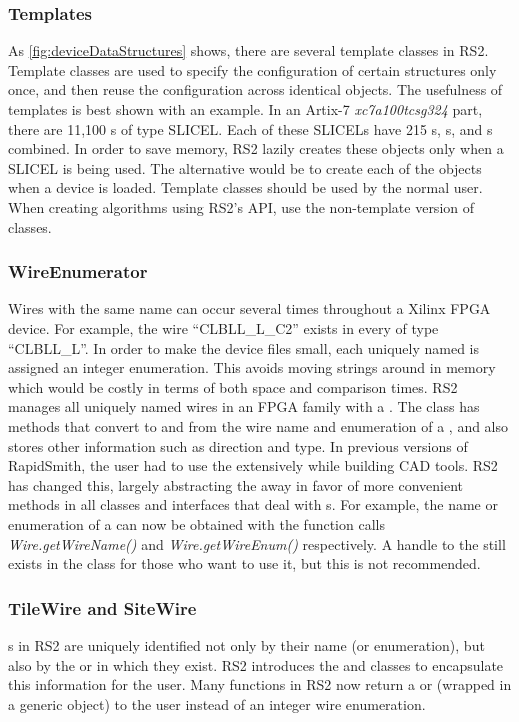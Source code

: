 \subsubsection{Templates}
As \autoref{fig:deviceDataStructures} shows, there are several template
classes in RS2. Template classes are used to specify the configuration of
certain structures only once, and then reuse the configuration across
identical objects. The usefulness of templates is best shown with an example. In
an Artix-7 {\em xc7a100tcsg324} part, there are 11,100 s of type
SLICEL. Each of these SLICELs have 215 s,  s, and
 s combined. In order to save memory, RS2
lazily creates these objects only when a SLICEL  is being used. The
alternative would be to create each of the objects when a device is loaded.
Template classes should  be used by the normal user. When creating
algorithms using RS2's API, use the non-template version of classes.

\subsubsection{WireEnumerator} \label{wireEnum}
Wires with the same name can occur several times throughout a Xilinx FPGA
device. For example, the wire ``CLBLL\-\_L\_C2'' exists in every  of
type ``CLBLL\_L''. In order to make the device files small, each uniquely named 
is assigned an integer enumeration. This avoids moving strings around in
memory which would be costly in terms of both space and comparison times.
RS2 manages all uniquely named wires in an FPGA family with a
. The  class has methods that convert to
and from the wire name and enumeration of a , and also stores other
 information such as direction and type. In previous versions of
RapidSmith, the user had to use the  extensively while
building CAD tools. RS2 has changed this, largely abstracting the
 away in favor of more convenient methods in all classes and
interfaces that deal with s. For example, the name or enumeration of a
 can now be obtained with the function calls {\em Wire.getWireName()}
and {\em Wire.getWireEnum()} respectively. A handle to the
 still exists in the  class for those who
want to use it, but this is not recommended. 

\subsubsection{TileWire and SiteWire} \label{wires}
s in RS2 are uniquely identified not only by their name
(or enumeration), but also by the  or  in which they exist.
RS2 introduces the  and  classes to
encapsulate this information for the user. Many functions in RS2 now
return a  or  (wrapped in a generic 
object) to the user instead of an integer wire enumeration.

